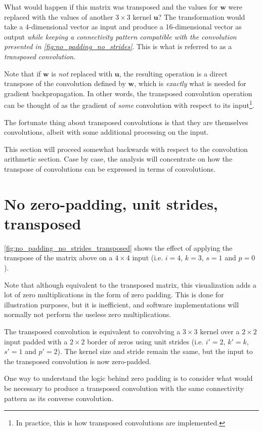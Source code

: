 \documentclass{report}
\begin{document}
What would happen if this matrix was transposed and the values for $\mathbf{w}$
were replaced with the values of another $3 \times 3$ kernel $\mathbf{u}$? The
transformation would take a 4-dimensional vector as input and produce a
16-dimensional vector as output {\em while keeping a connectivity pattern
compatible with the convolution presented in
\autoref{fig:no_padding_no_strides}}. This is what is referred to as a {\em
transposed convolution}.

Note that if $\mathbf{w}$ is {\em not} replaced with $\mathbf{u}$, the resulting
operation is a direct transpose of the convolution defined by $\mathbf{w}$,
which is {\em exactly} what is needed for gradient backpropagation. In other
words, the transposed convolution operation can be thought of as the gradient of
{\em some} convolution with respect to its input\footnote{
    In practice, this is how transposed convolutions are implemented.}.

The fortunate thing about transposed convolutions is that they are themselves
convolutions, albeit with some additional processing on the input.

This section will proceed somewhat backwards with respect to the convolution
arithmetic section. Case by case, the analysis will concentrate on how the
transpose of convolutions can be expressed in terms of convolutions.

\section{No zero-padding, unit strides, transposed}

\autoref{fig:no_padding_no_strides_transposed} shows the effect of applying the
transpose of the matrix above on a $4 \times 4$ input (i.e. $i = 4$, $k = 3$, $s
= 1$ and $p = 0$).

Note that although equivalent to the transposed matrix, this visualization adds
a lot of zero multiplications in the form of zero padding. This is done for
illustration purposes, but it is inefficient, and software implementations will
normally not perform the useless zero multiplications.

The transposed convolution is equivalent to convolving a $3 \times 3$ kernel
over a $2 \times 2$ input padded with a $2 \times 2$ border of zeros using unit
strides (i.e. $i' = 2$, $k' = k$, $s' = 1$ and $p' = 2$). The kernel size and
stride remain the same, but the input to the transposed convolution is now
zero-padded.

One way to understand the logic behind zero padding is to consider what would be
necessary to produce a transposed convolution with the same connectivity pattern
as its converse convolution.
\end{document}

